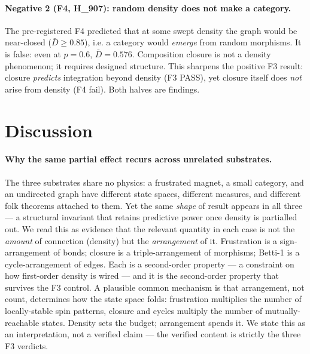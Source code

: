 \documentclass[11pt,a4paper]{article}
\begin{document}
\paragraph{Negative 2 (F4, H\_907): random density does not make a category.}
The pre-registered F4 predicted that at some swept density the graph would be
near-closed ($\bar D \ge 0.85$), i.e. a category would \emph{emerge} from random
morphisms. It is false: even at $p{=}0.6$, $\bar D = 0.576$. Composition closure
is not a density phenomenon; it requires designed structure. This sharpens the
positive F3 result: closure \emph{predicts} integration beyond density (F3 PASS),
yet closure itself does \emph{not} arise from density (F4 fail). Both halves are
findings.

\section{Discussion}
\label{sec:discussion}

\paragraph{Why the same partial effect recurs across unrelated substrates.}
The three substrates share no physics: a frustrated magnet, a small category,
and an undirected graph have different state spaces, different measures, and
different folk theorems attached to them. Yet the same \emph{shape} of result
appears in all three --- a structural invariant that retains predictive power
once density is partialled out. We read this as evidence that the relevant
quantity in each case is not the \emph{amount} of connection (density) but the
\emph{arrangement} of it. Frustration is a sign-arrangement of bonds; closure is
a triple-arrangement of morphisms; Betti-1 is a cycle-arrangement of edges. Each
is a second-order property --- a constraint on how first-order density is wired
--- and it is the second-order property that survives the F3 control. A plausible
common mechanism is that arrangement, not count, determines how the state space
folds: frustration multiplies the number of locally-stable spin patterns, closure
and cycles multiply the number of mutually-reachable states. Density sets the
budget; arrangement spends it. We state this as an interpretation, not a verified
claim --- the verified content is strictly the three F3 verdicts.
\end{document}
